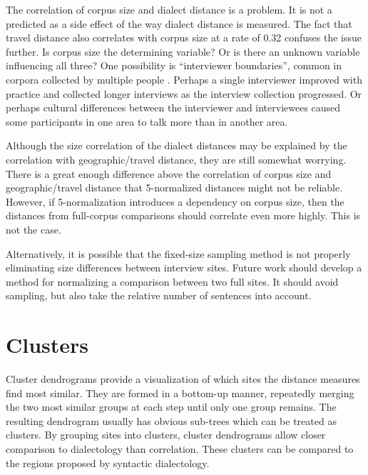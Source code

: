 The correlation of corpus size and dialect distance is a problem. It
is not a predicted as a side effect of the way dialect distance is
measured. The fact that travel distance also correlates with corpus
size at a rate of 0.32 confuses the issue further. Is corpus size the
determining variable? Or is there an unknown variable influencing all
three? One possibility is ``interviewer boundaries'', common in
corpora collected by multiple people \cite{nerbonne03}.  Perhaps a
single interviewer improved with practice and collected longer interviews as
the interview collection progressed. Or perhaps cultural differences
between the interviewer and interviewees caused some participants in
one area to talk more than in another area.

Although the size correlation of the dialect distances may be
explained by the correlation with geographic/travel distance, they are still
somewhat worrying. There is a great enough difference above the
correlation of corpus size and geographic/travel distance that 5-normalized
distances might not be reliable.
However, if 5-normalization introduces a dependency on corpus size,
then the distances from full-corpus comparisons should correlate even
more highly. This is not the case.

Alternatively, it is possible that the fixed-size sampling method is not
properly eliminating size differences between interview sites. Future work
should develop a method for normalizing a comparison between two full
sites. It should avoid sampling, but also take the relative number
of sentences into account.

\section{Clusters}
\label{section-clusters}

Cluster dendrograms provide a visualization of which sites the
distance measures find most similar. They are formed in a bottom-up
manner, repeatedly merging the two most similar groups at each step
until only one group remains. The resulting dendrogram usually has
obvious sub-trees which can be treated as clusters. By grouping sites
into clusters, cluster dendrograms allow closer comparison to
dialectology than correlation. These clusters can be compared to the
regions proposed by syntactic dialectology.

